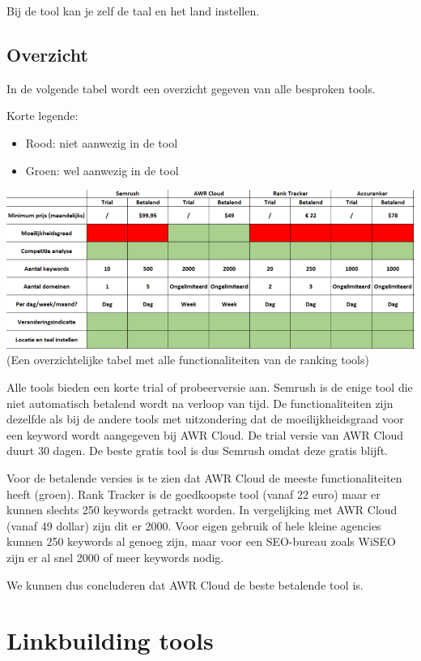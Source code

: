Bij de tool kan je zelf de taal en het land instellen. 

\subsection{Overzicht}
\label{ch: Overzicht}

In de volgende tabel wordt een overzicht gegeven van alle besproken tools. 

Korte legende: 
\begin{itemize}
\item Rood: niet aanwezig in de tool
\item Groen: wel aanwezig in de tool
\end{itemize}

\includegraphics[width=\linewidth]{Bachelorproef/bachelor/img/rankingtabel.PNG}
(Een overzichtelijke tabel met alle functionaliteiten van de ranking tools)

Alle tools bieden een korte trial of probeerversie aan. Semrush is de enige tool die niet automatisch betalend wordt na verloop van tijd. De functionaliteiten zijn dezelfde als bij de andere tools met uitzondering dat de moeilijkheidsgraad voor een keyword wordt aangegeven bij AWR Cloud. De trial versie van AWR Cloud duurt 30 dagen. De beste gratis tool is dus Semrush omdat deze gratis blijft. 

Voor de betalende versies is te zien dat AWR Cloud de meeste functionaliteiten heeft (groen). Rank Tracker is de goedkoopste tool (vanaf 22 euro) maar er kunnen slechts 250 keywords getrackt worden. In vergelijking met AWR Cloud (vanaf 49 dollar) zijn dit er 2000. Voor eigen gebruik of hele kleine agencies kunnen 250 keywords al genoeg zijn, maar voor een SEO-bureau zoals WiSEO zijn er al snel 2000 of meer keywords nodig. 

We kunnen dus concluderen dat AWR Cloud de beste betalende tool is. 

\section{Linkbuilding tools}
\label{ch: Linkbuilding tools}

